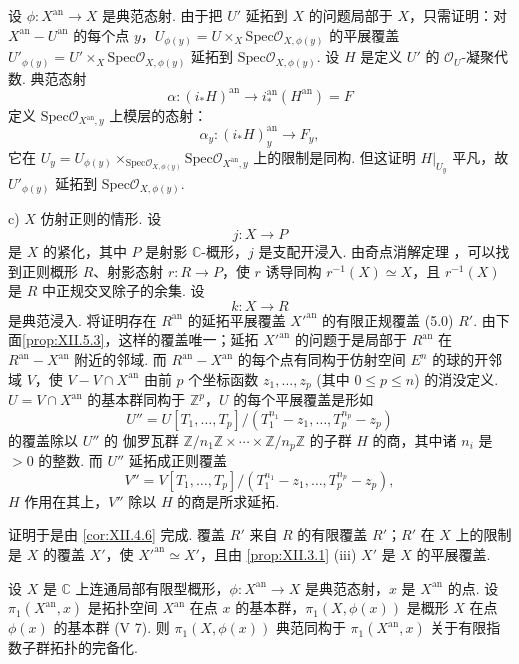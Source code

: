 设 $\phi \colon X^{\mathrm{an}} \to X$ 是典范态射. 由于把 $U'$ 延拓到 $X$ 的问题局部于 $X$，只需证明：对 $X^{\mathrm{an}} - U^{\mathrm{an}}$ 的每个点 $y$，$U_{\phi(y)} = U \times_X \mathrm{Spec} \mathcal{O}_{X,\phi(y)}$ 的平展覆盖 $U'_{\phi(y)} = U' \times_X \mathrm{Spec} \mathcal{O}_{X,\phi(y)}$ 延拓到 $\mathrm{Spec} \mathcal{O}_{X,\phi(y)}$. 设 $H$ 是定义 $U'$ 的 $\mathcal{O}_U$-凝聚代数. 典范态射
\[
\alpha \colon (i_* H)^{\mathrm{an}} \longrightarrow i_*^{\mathrm{an}}(H^{\mathrm{an}}) = F
\]
定义 $\mathrm{Spec} \mathcal{O}_{X^{\mathrm{an}},y}$ 上模层的态射：
\[
\alpha_y \colon (i_* H)^{\mathrm{an}}_y \longrightarrow F_y,
\]
它在 $U_y = U_{\phi(y)} \times_{\mathrm{Spec} \mathcal{O}_{X,\phi(y)}} \mathrm{Spec} \mathcal{O}_{X^{\mathrm{an}},y}$ 上的限制是同构. 但这证明 $H|_{U_y}$ 平凡，故 $U'_{\phi(y)}$ 延拓到 $\mathrm{Spec} \mathcal{O}_{X,\phi(y)}$.

c) $X$ 仿射正则的情形. 设
\[
j \colon X \longrightarrow P
\]
是 $X$ 的紧化，其中 $P$ 是射影 $\mathbb{C}$-概形，$j$ 是支配开浸入. 由奇点消解定理 \cite{exp12-8}，可以找到正则概形 $R$、射影态射 $r \colon R \to P$，使 $r$ 诱导同构 $r^{-1}(X) \simeq X$，且 $r^{-1}(X)$ 是 $R$ 中正规交叉除子的余集. 设
\[
k \colon X \longrightarrow R
\]
是典范浸入. 将证明存在 $R^{\mathrm{an}}$ 的延拓平展覆盖 $X'^{\mathrm{an}}$ 的有限正规覆盖 (5.0) $R'$. 由下面\cref{prop:XII.5.3}，这样的覆盖唯一；延拓 $X'^{\mathrm{an}}$ 的问题于是局部于 $R^{\mathrm{an}}$ 在 $R^{\mathrm{an}} - X^{\mathrm{an}}$ 附近的邻域. 而 $R^{\mathrm{an}} - X^{\mathrm{an}}$ 的每个点有同构于仿射空间 $E^n$ 的球的开邻域 $V$，使 $V - V \cap X^{\mathrm{an}}$ 由前 $p$ 个坐标函数 $z_1, \ldots, z_p$ (其中 $0 \leqslant p \leqslant n$) 的消没定义. $U = V \cap X^{\mathrm{an}}$ 的基本群同构于 $\mathbb{Z}^p$，$U$ 的每个平展覆盖是形如
\[
U'' = U[T_1, \ldots, T_p]/(T_1^{n_1} - z_1, \ldots, T_p^{n_p} - z_p)
\]
的覆盖除以 $U''$ 的 伽罗瓦群 $\mathbb{Z}/n_1\mathbb{Z} \times \cdots \times \mathbb{Z}/n_p\mathbb{Z}$ 的子群 $H$ 的商，其中诸 $n_i$ 是 $> 0$ 的整数. 而 $U''$ 延拓成正则覆盖
\[
V'' = V[T_1, \ldots, T_p]/(T_1^{n_1} - z_1, \ldots, T_p^{n_p} - z_p),
\]
$H$ 作用在其上，$V''$ 除以 $H$ 的商是所求延拓.

证明于是由 \ref{cor:XII.4.6} 完成. 覆盖 $R'$ 来自 $R$ 的有限覆盖 $R'$；$R'$ 在 $X$ 上的限制是 $X$ 的覆盖 $X'$，使 $X'^{\mathrm{an}} \simeq X'$，且由 \ref{prop:XII.3.1} (iii) $X'$ 是 $X$ 的平展覆盖.

\begin{corollary}\label{cor:XII.5.2}
设 $X$ 是 $\mathbb{C}$ 上连通局部有限型概形，$\phi \colon X^{\mathrm{an}} \to X$ 是典范态射，$x$ 是 $X^{\mathrm{an}}$ 的点. 设 $\pi_1(X^{\mathrm{an}}, x)$ 是拓扑空间 $X^{\mathrm{an}}$ 在点 $x$ 的基本群，$\pi_1(X, \phi(x))$ 是概形 $X$ 在点 $\phi(x)$ 的基本群 (V 7). 则 $\pi_1(X, \phi(x))$ 典范同构于 $\pi_1(X^{\mathrm{an}}, x)$ 关于有限指数子群拓扑的完备化.
\end{corollary}

